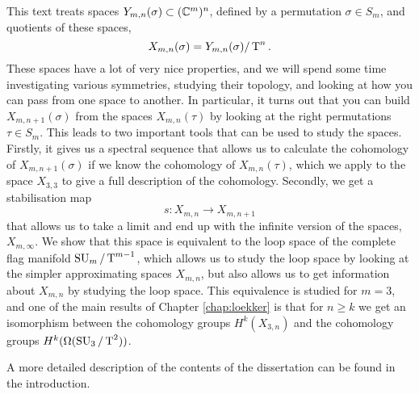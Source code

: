 This text treats spaces $Y_{m,n}(\sigma) \subset (\mathbb{C}^m)^n$, defined by
a permutation $\sigma\in S_m$, and quotients of these spaces,
\[ X_{m,n}(\sigma) = Y_{m,n}(\sigma) / \operatorname{T}^n. \]
These spaces have a lot of very nice properties, and we will spend
some time investigating various symmetries, studying their topology,
and looking at how you can pass from one space to another. In
particular, it turns out that you can build $X_{m,n+1}(\sigma)$ from
the spaces $X_{m,n}(\tau)$ by looking at the right permutations $\tau
\in S_m$. This leads to two important tools that can be used to study
the spaces. Firstly, it gives us a spectral sequence that allows us to
calculate the cohomology of $X_{m,n+1}(\sigma)$ if we know the
cohomology of $X_{m,n}(\tau)$, which we apply to the space $X_{3,3}$
to give a full description of the cohomology. Secondly, we get a
stabilisation map
\[ s : X_{m,n} \to X_{m,n+1} \]
that allows us to take a limit and end up with the infinite version of
the spaces, $X_{m,\infty}$. We show that this space is equivalent to
the loop space of the complete flag manifold $\operatorname{SU}_{m}/\operatorname{T}^{m-1}$, which allows
us to study the loop space by looking at the simpler approximating
spaces $X_{m,n}$, but also allows us to get information about
$X_{m,n}$ by studying the loop space. This equivalence is studied
for $m=3$, and one of the main results of Chapter \ref{chap:loekker}
is that for $n \geq k$ we get an isomorphism between the cohomology
groups $H^k(X_{3,n})$ and the cohomology groups
$H^k(\Omega(\operatorname{SU}_3/\operatorname{T}^2))$.

A more detailed description of the contents of the dissertation can be
found in the introduction.





